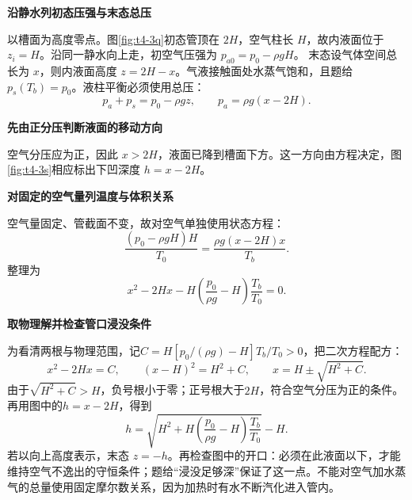 \begin{solution}\textbf{沿静水列初态压强与末态总压}\par\nobreak
以槽面为高度零点。图\ref{fig:t4-3q}初态管顶在 $2H$，空气柱长 $H$，故内液面位于 $z_i=H$。沿同一静水向上走，初空气压强为 $p_{a0}=p_0-\rho gH$。
末态设气体空间总长为 $x$，则内液面高度 $z=2H-x$。气液接触面处水蒸气饱和，且题给 $p_s(T_b)=p_0$。液柱平衡必须使用总压：
\[p_a+p_s=p_0-\rho gz,\qquad p_a=\rho g(x-2H).\]


\par\medskip{}\noindent\textbf{先由正分压判断液面的移动方向}\par\nobreak
空气分压应为正，因此 $x>2H$，液面已降到槽面下方。这一方向由方程决定，图\ref{fig:t4-3s}相应标出下凹深度 $h=x-2H$。



\par\medskip{}\noindent\textbf{对固定的空气量列温度与体积关系}\par\nobreak
空气量固定、管截面不变，故对空气单独使用状态方程：
\[\frac{(p_0-\rho gH)H}{T_0}=\frac{\rho g(x-2H)x}{T_b}.\]
整理为
\[x^2-2Hx-H\left(\frac{p_0}{\rho g}-H\right)\frac{T_b}{T_0}=0.\]


\par\medskip{}\noindent\textbf{取物理解并检查管口浸没条件}\par\nobreak
为看清两根与物理范围，记$C=H[p_0/(\rho g)-H]T_b/T_0>0$，把二次方程配方：
\[
x^2-2Hx=C,\qquad (x-H)^2=H^2+C,
\qquad x=H\pm\sqrt{H^2+C}.
\]
由于$\sqrt{H^2+C}>H$，负号根小于零；正号根大于$2H$，符合空气分压为正的条件。再用图中的$h=x-2H$，得到
\[\boxed{h=\sqrt{H^2+H\left(\frac{p_0}{\rho g}-H\right)\frac{T_b}{T_0}}-H}.\]
若以向上高度表示，末态 $z=-h$。再检查图中的开口：必须在此液面以下，才能维持空气不逸出的守恒条件；题给“浸没足够深”保证了这一点。不能对空气加水蒸气的总量使用固定摩尔数关系，因为加热时有水不断汽化进入管内。
\end{solution}
